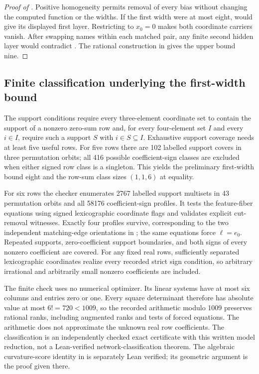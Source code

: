 \begin{proof}[Proof of ]
Positive homogeneity permits removal of every bias without changing the
computed function or the widths. If the first width were at most eight,
 would give its displayed first layer.
Restricting to $x_0=0$ makes both coordinate carriers vanish. After swapping
names within each matched pair, any finite second hidden layer would
contradict . The rational construction in
 gives the upper bound nine.
\end{proof}

\subsection{Finite classification underlying the first-width bound}
\label{app:first-five-classification}

The support conditions require every three-element coordinate set to
contain the support of a nonzero zero-sum row and, for every four-element
set $I$ and every $i\in I$, require such a support $S$ with
$i\in S\subseteq I$. Exhaustive support coverage needs at least five
useful rows. For five rows there are 102 labelled support covers in three
permutation orbits; all 416 possible coefficient-sign classes are excluded
when either signed row class is a singleton. This yields the preliminary
first-width bound eight and the row-sum class sizes $(1,1,6)$ at equality.

For six rows the checker enumerates 2767 labelled support multisets in
43 permutation orbits and all 58176 coefficient-sign profiles. It tests
the feature-fiber equations using signed lexicographic coordinate flags
and validates explicit cut-removal witnesses. Exactly four profiles
survive, corresponding to the two independent matching-edge orientations
in ; the same equations force
$\ell=e_0$. Repeated supports, zero-coefficient support boundaries, and
both signs of every nonzero coefficient are covered. For any fixed real
rows, sufficiently separated lexicographic coordinates realize every
recorded strict sign condition, so arbitrary irrational and arbitrarily
small nonzero coefficients are included.

The finite check uses no numerical optimizer. Its linear systems have
at most six columns and entries zero or one. Every square determinant
therefore has absolute value at most $6!=720<1009$, so the recorded
arithmetic modulo 1009 preserves rational ranks, including augmented
ranks and tests of forced equations. The arithmetic does not approximate
the unknown real row coefficients. The classification is an independently
checked exact certificate with this written model reduction, not a
Lean-verified network-classification theorem. The algebraic curvature-score
identity in  is separately Lean verified;
its geometric argument is the proof given there.

